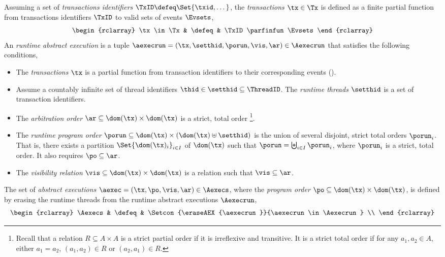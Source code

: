 \begin{defn}
\label{def:run-abs-exec}
\label{def:abs-exec}
Assuming a set of \emph{transactions identifiers} \( \TxID \defeq \Set{\txid, \dots}\), the \emph{transactions} \( \tx \in \Tx \) is defined as a finite partial function from transactions identifiers \( \TxID \) to valid sets of events \( \Evsets \),
\[
\begin{rclarray}
\tx \in \Tx & \defeq & \TxID \parfinfun \Evsets
\end{rclarray}
\]
An \emph{runtime abstract execution} is a tuple \( \aexecrun = (\tx, \setthid, \porun, \vis, \ar) \in \Aexecrun \) that satisfies the following conditions,
\begin{itemize}
\item
The \emph{transactions} \( \tx \) is a partial function from transaction identifiers to their corresponding events ().
\item 
Assume a countably infinite set of thread identifiers \( \thid \in \setthid \subseteq \ThreadID \). 
The \emph{runtime threads} \( \setthid \) is a set of transaction identifiers.
\item 
The \emph{arbitration order} $\ar \subseteq \dom(\tx) \times \dom(\tx)$ is a strict, total order%
\footnote{Recall that a relation $R \subseteq A \times A$ is a strict partial order if it is irreflexive and transitive.
It is a strict total order if for any $a_1, a_2 \in A$, either $a_1 = a_2$, $(a_1, a_2) \in R$ or $(a_2, a_1) \in R$.}.
\item 
The \emph{runtime program order} $\porun \subseteq \dom(\tx) \times ( \dom(\tx) \uplus \setthid )$ is the union of several disjoint, strict total orders \( \porun_{i} \).
That is, there exists a partition $\Set{ \dom(\tx)_{i} }_{i \in I}$ of $\dom(\tx)$ such that $\porun = \biguplus_{i \in I} \porun_{i}$, where $\porun_{i}$ is a strict, total order.
It also requires \( \po \subseteq \ar\).
\item 
The \emph{visibility relation} $\vis \subseteq \dom(\tx) \times \dom(\tx)$ is a relation such that \( \vis \subseteq \ar \).
\end{itemize} 
The set of \emph{abstract executions} $\aexec  = (\tx, \po, \vis, \ar) \in \Aexecs$, where the \emph{program order} \( \po \subseteq \dom(\tx) \times \dom(\tx)\), is defined by erasing the runtime threads from the runtime abstract executions \( \Aexecrun \),
\[
\begin{rclarray}
    \Aexecs & \defeq & \Setcon{\eraseAEX{\aexecrun}}{\aexecrun \in \Aexecrun} \\

\end{rclarray}\]
\end{defn}
